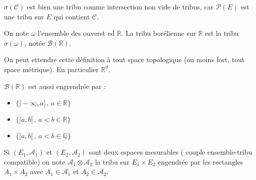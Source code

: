 \begin{remarque}
	$\sigma(\mathscr{C})$ est bien une tribu comme intersection non vide de tribus,
	car $\mathscr{P}(E)$ est une tribu sur $E$ qui contient $\mathscr{C}$.
\end{remarque}

\begin{definition}
	On note $\omega$ l'ensemble des ouverst ed $\mathbb{R}$. La tribu borélienne sur
	$\mathbb{R}$ est la tribu $\sigma(\omega)$, notée $\mathscr{B}(\mathbb{R})$.
\end{definition}


\begin{remarque}
	On peut ettendre cette définition à tout space topologique (ou moins fort, tout space métrique). En particulier
	$\mathbb{R}^d$.
\end{remarque}

\begin{remarque}
	$\mathscr{B}(\mathbb{R})$ est aussi engrendrée par :
	\begin{itemize}
		\item $\{ ]-\infty, a[\,,\, a \in \mathbb{R} \}$
		\item $\{ ]a, b[\,,\, a < b \in \mathbb{R} \}$
		\item $\{ ]a, b[\,,\, a < b \in \mathbb{Q} \}$
	\end{itemize}
\end{remarque}


\begin{definition}
	Si $(E_1, \mathscr{A}_1)$ et $(E_2, \mathscr{A}_2)$ sont deux espaces mesurables ( couple ensemble-tribu compatible)
	on note $\mathscr{A}_1 \otimes \mathscr{A}_2$ la tribu sur $E_1 \times E_2$ engendrée
	par les rectangles $A_1 \times A_2$ avec $A_1 \in \mathscr{A}_1$ et $A_2 \in \mathscr{A}_2$.

\end{definition}



